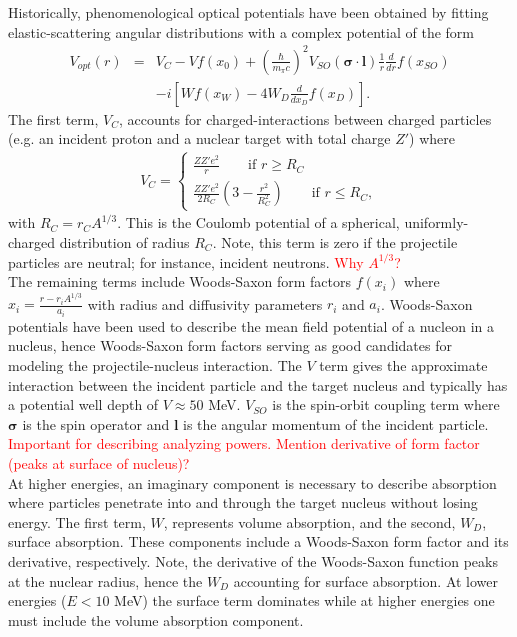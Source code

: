 \documentclass[preprintnumbers,floatfix,aps,prc,preprint,nofootinbib]{revtex4-1}
\begin{document}
Historically, phenomenological optical potentials have been obtained by fitting elastic-scattering angular distributions with a complex potential of the form
%
\begin{eqnarray}
	\label{eq:phenomenological_optical_potential}
	V_{opt}(r) &=& V_C - V f(x_0) + (\frac{\hbar}{m_{\pi} c})^2 V_{SO}(\bm{\sigma} \cdot \textbf{l}) \frac{1}{r} \frac{d}{dr} f(x_{SO}) \nonumber \\ 
& &- i [W f(x_W) - 4 W_D \frac{d}{dx_D} f(x_D)].
\end{eqnarray}
%
The first term, $V_C$, accounts for charged-interactions between charged particles (e.g. an incident proton and a nuclear target with total charge $Z'$) where
%
\begin{eqnarray}
	\label{eq:coulomb_potential}
	V_C =
	\begin{cases}
		\frac{Z Z' e^2}{r} \qquad \text{if $r \geq R_C$} \\
		\frac{Z Z' e^2}{2 R_C} (3 - \frac{r^2}{R_C^2}) \qquad \text{if $r \leq R_C$},
	\end{cases}
\end{eqnarray}
%
with $R_C = r_C A^{1/3}$. This is the Coulomb potential of a spherical, uniformly-charged distribution of radius $R_C$. Note, this term is zero if the projectile particles are neutral; for instance, incident neutrons. \textcolor{red}{Why $A^{1/3}$?}
\\

The remaining terms include Woods-Saxon form factors $f(x_i)$ where $x_i = \frac{r-r_i A^{1/3}}{a_i}$ with radius and diffusivity parameters $r_i$ and $a_i$. Woods-Saxon potentials have been used to describe the mean field potential of a nucleon in a nucleus, hence Woods-Saxon form factors serving as good candidates for modeling the projectile-nucleus interaction. The $V$ term gives the approximate interaction between the incident particle and the target nucleus and typically has a potential well depth of $V \approx 50$ MeV. $V_{SO}$ is the spin-orbit coupling term where $\bm{\sigma}$ is the spin operator and $\bm{l}$ is the angular momentum of the incident particle. \textcolor{red}{Important for describing analyzing powers. Mention derivative of form factor (peaks at surface of nucleus)?}
\\

At higher energies, an imaginary component is necessary to describe absorption where particles penetrate into and through the target nucleus without losing energy. The first term, $W$, represents volume absorption, and the second, $W_D$, surface absorption. These components include a Woods-Saxon form factor and its derivative, respectively. Note, the derivative of the Woods-Saxon function peaks at the nuclear radius, hence the $W_D$ accounting for surface absorption. At lower energies ($E < 10$ MeV) the surface term dominates while at higher energies one must include the volume absorption component.
\\
\end{document}
